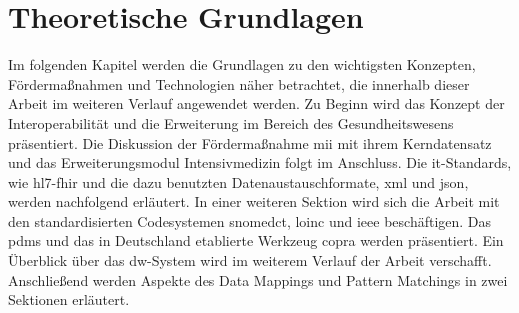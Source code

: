 \chapter{Theoretische Grundlagen} \label{ch:theobasis}

Im folgenden Kapitel werden die Grundlagen zu den wichtigsten Konzepten, Fördermaßnahmen und Technologien näher betrachtet, die innerhalb dieser Arbeit im weiteren Verlauf angewendet werden. Zu Beginn wird das Konzept der Interoperabilität und die Erweiterung im Bereich des Gesundheitswesens präsentiert. Die Diskussion der Fördermaßnahme \glqq\ac{mii}\grqq{} mit ihrem Kerndatensatz und das Erweiterungsmodul Intensivmedizin folgt im Anschluss. Die \ac{it}-Standards, wie \ac{hl7}-\ac{fhir} und die dazu benutzten Datenaustauschformate, \ac{xml} und \ac{json}, werden nachfolgend erläutert. In einer weiteren Sektion wird sich die Arbeit mit den standardisierten Codesystemen \ac{snomedct}, \ac{loinc} und \ac{ieee} beschäftigen. Das \ac{pdms} und das in Deutschland etablierte Werkzeug \ac{copra} werden präsentiert. Ein Überblick über das \ac{dw}-System wird im weiterem Verlauf der Arbeit verschafft. Anschließend werden Aspekte des Data Mappings und Pattern Matchings in zwei Sektionen erläutert.